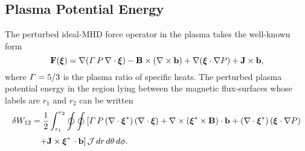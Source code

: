 \documentclass[12pt,prb,aps]{revtex4-1}
\newcommand {\bxi}{\mbox{\boldmath$\xi$}}
\begin{document}
\subsection{Plasma Potential Energy}
The perturbed ideal-MHD  force operator in the plasma takes the well-known form\,\cite{freidberg,ideal}
\begin{equation}
{\bf F}(\bxi)= \nabla({\mit\Gamma}\,P\,\nabla\cdot\bxi) - {\bf B}\times(\nabla\times {\bf b})+\nabla(\bxi\cdot\nabla P)+{\bf J}\times  {\bf b},
\end{equation}
where ${\mit\Gamma}=5/3$ is the plasma ratio of specific heats. 
The perturbed  plasma potential energy in the region lying between the magnetic  flux-surfaces whose labels are $r_1$ and $r_2$ can be written\,\cite{ideal}
\begin{align}
\delta W_{12} &= \frac{1}{2}\int_{r_1}^{r_2}\oint\oint\left[{\mit\Gamma}\,P\,(\nabla\cdot\bxi^\ast)\,(\nabla\cdot\bxi)+ \nabla\times (\bxi^\ast\times {\bf B})\cdot {\bf b}
+(\nabla\cdot\bxi^\ast)\,(\bxi\cdot\nabla P)\right.\nonumber\\[0.5ex]&\phantom{=}
\left.+{\bf J}\times \bxi^\ast\,\cdot{\bf b}\right]{\cal J}\,dr\,d\theta\,d\phi.
\end{align}
\end{document}
